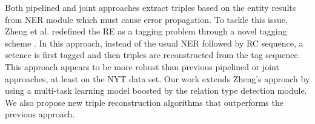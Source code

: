 Both pipelined and joint approaches extract triples based on the entity results
from NER module which must cause error propagation. To tackle this issue, 
Zheng et al. redefined the RE as a tagging problem through a novel 
tagging scheme \cite{Zheng2017}. In this approach, instead of the usual
NER followed by RC sequence, a setence is first tagged and then triples are
reconstructed from the tag sequence.
This approach appears to be more robust than previous pipelined or joint approaches,
at least on the NYT data set. Our work extends Zheng's approach by using a
multi-task learning model boosted by the relation type detection module. 
We also propose new triple reconstruction algorithms that outperforms 
the previous approach.

